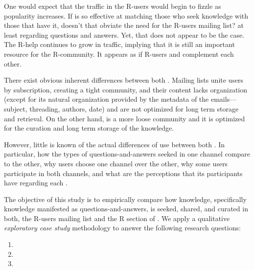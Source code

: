 One would expect that the traffic in the R-users \ml would begin to fizzle as \SO popularity increases. If \SO is so effective at matching those who seek knowledge with those that have it, doesn't that obviate the need for the R-users mailing list? at least regarding questions and answers. Yet, that does not appear to be the case. The R-help \ml continues to grow in traffic, implying that it is still an important resource for the R-community. It appears as if R-users and \SO complement each other.

There exist obvious inherent differences between both \channels. Mailing lists unite users by subscription, creating a tight community, and their content lacks organization (except for its natural organization provided by the metadata of the emails---subject, threading, authors, date) and are not optimized for long term storage and retrieval. On the other hand, \SO is a more loose community and it is optimized for the curation and long term storage of the knowledge.

However, little is known of the actual differences of use between both \channels. In particular, how the types of questions-and-answers seeked in one channel compare to the other, why users choose one channel over the other, why some users participate in both channels, and what are the perceptions that its participants have regarding each \channel.



The objective of this study is to empirically compare how knowledge, specifically knowledge manifested as questions-and-answers, is seeked, shared, and curated in both, the R-users mailing list and the R section of \SO. We apply a qualitative \textit{exploratory case study} methodology to answer the following research questions:

\begin{enumerate}[label=\bfseries{RQ-\arabic*.},itemsep=3pt, topsep=2pt, leftmargin=3em, parsep=0pt]
        \item \rqa
        \item \rqb
        \item \rqc
    \end{enumerate}




